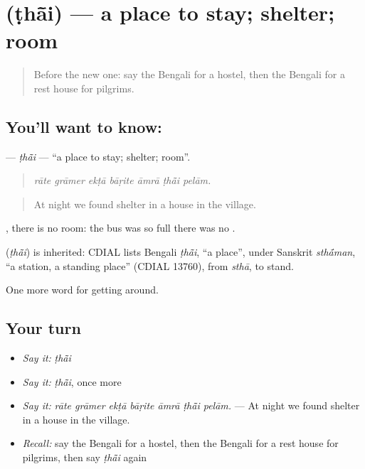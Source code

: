 \section[\texorpdfstring{\bn{ঠাঁই} (ṭhā̃i)}{ঠাঁই (ṭhā̃i)}]{ (ṭhā̃i) — a place to stay; shelter; room}

\label{lesson:BN-C406-thai}



\begin{quote}
Before the new one: say the Bengali for a hostel, then the Bengali for a rest house for pilgrims.
\end{quote}

\subsection*{You'll want to know: }
\textbf{} — \emph{ṭhā̃i} — \textquotedblleft{}a place to stay; shelter; room\textquotedblright{}.

\begin{quote}
      
\end{quote}

\begin{quote}
\emph{rāte grāmer ekṭā bāṛite āmrā ṭhā̃i pelām.}
\end{quote}

\begin{quote}
At night we found shelter in a house in the village.
\end{quote}

 , there is no room: the bus was so full there was no .

\begin{cousinweb}
\textbf{} (\emph{ṭhā̃i}) is inherited: CDIAL lists Bengali \emph{ṭhā̃i}, \textquotedblleft{}a place\textquotedblright{}, under Sanskrit \emph{sth\'{\={a}}man}, \textquotedblleft{}a station, a standing place\textquotedblright{} (CDIAL 13760), from \emph{sthā}, to stand.
\end{cousinweb}

\begin{grammarlens}[title={What you've built}]
One more word for getting around.
\end{grammarlens}

\subsection*{Your turn}
\begin{itemize}
\raggedright
  \item \emph{Say it:} \emph{ṭhā̃i}
  \item \emph{Say it:} \emph{ṭhā̃i}, once more
  \item \emph{Say it:} \emph{rāte grāmer ekṭā bāṛite āmrā ṭhā̃i pelām.} — At night we found shelter in a house in the village.
  \item \emph{Recall:} say the Bengali for a hostel, then the Bengali for a rest house for pilgrims, then say \emph{ṭhā̃i} again
\end{itemize}

